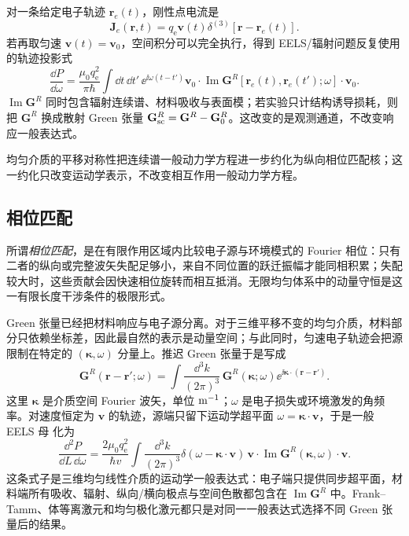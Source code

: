 对一条给定电子轨迹 $\mathbf r_e(t)$，刚性点电流是
\begin{equation*}
\mathbf J_e(\mathbf r,t)=q_{\mathrm e}\mathbf v(t)\delta^{(3)}[\mathbf r-\mathbf r_e(t)].
\end{equation*}
若再取匀速 $\mathbf v(t)=\mathbf v_0$，空间积分可以完全执行，得到 EELS/辐射问题反复使用的轨迹投影式
\begin{equation}
\boxed{
\frac{\dd P}{\dd\omega}
=\frac{\mu_0q_{\mathrm e}^2}{\pi\hbar}
\int\!\dd t\,\dd t'\,
\ee^{\ii\omega(t-t')}
\mathbf v_0\cdot
\operatorname{Im}\mathbf G^R[\mathbf r_e(t),\mathbf r_e(t');\omega]
\cdot\mathbf v_0.}
\label{eq:green_tensor_eels_master}
\end{equation}
$\operatorname{Im}\mathbf G^R$ 同时包含辐射连续谱、材料吸收与表面模；若实验只计结构诱导损耗，则把 $\mathbf G^R$ 换成散射 Green 张量 $\mathbf G_{\rm sc}^R=\mathbf G^R-\mathbf G_0^R$。这改变的是观测通道，不改变响应一般表达式。\cite{RiveraKaminer2020Quasiparticles,GarciaDeAbajoDiGiulio2021}

均匀介质的平移对称性把连续谱一般动力学方程进一步约化为纵向相位匹配核；这一约化只改变运动学表示，不改变相互作用一般动力学方程。





\subsection{相位匹配}

所谓\emph{相位匹配}，是在有限作用区域内比较电子源与环境模式的 Fourier 相位：只有二者的纵向或完整波矢失配足够小，来自不同位置的跃迁振幅才能同相积累；失配较大时，这些贡献会因快速相位旋转而相互抵消。无限均匀体系中的动量守恒是这一有限长度干涉条件的极限形式。

Green 张量已经把材料响应与电子源分离。对于三维平移不变的均匀介质，材料部分只依赖坐标差，因此最自然的表示是动量空间；与此同时，匀速电子轨迹会把源限制在特定的 $(\boldsymbol\kappa,\omega)$ 分量上。推迟 Green 张量于是写成
\begin{equation*}
\mathbf G^R(\mathbf r-\mathbf r';\omega)
=\int\frac{\dd^3 k}{(2\pi)^3}\,
\mathbf G^R(\boldsymbol\kappa;\omega)
\ee^{\ii\boldsymbol\kappa\cdot(\mathbf r-\mathbf r')}.
\end{equation*}
这里 $\boldsymbol\kappa$ 是介质空间 Fourier 波矢，单位 ${\rm m^{-1}}$；$\omega$ 是电子损失或环境激发的角频率。对速度恒定为 $\mathbf v$ 的轨迹，源端只留下运动学超平面 $\omega=\boldsymbol\kappa\cdot\mathbf v$，于是一般 EELS 母 化为
\begin{equation}
\boxed{
\frac{\dd^2 P}{\dd L\,\dd\omega}
=\frac{2\mu_0q_{\mathrm e}^2}{\hbar v}
\int\frac{\dd^3 k}{(2\pi)^3}
\delta(\omega-\boldsymbol\kappa\cdot\mathbf v)
\,\mathbf v\cdot\operatorname{Im}\mathbf G^R(\boldsymbol\kappa,\omega)\cdot\mathbf v.}
\label{eq:homogeneous_green_loss_general}
\end{equation}
这条式子是三维均匀线性介质的运动学一般表达式：电子端只提供同步超平面，材料端所有吸收、辐射、纵向/横向极点与空间色散都包含在 $\operatorname{Im}\mathbf G^R$ 中。Frank--Tamm、体等离激元和均匀极化激元都只是对同一一般表达式选择不同 Green 张量后的结果。

